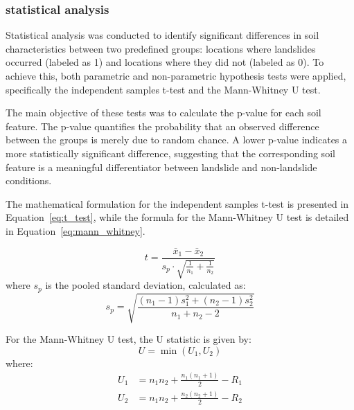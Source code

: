 \subsubsection{statistical analysis}
Statistical analysis was conducted to identify significant differences in soil characteristics between two predefined groups: locations where landslides occurred (labeled as 1) and locations where they did not (labeled as 0). To achieve this, both parametric and non-parametric hypothesis tests were applied, specifically the independent samples t-test and the Mann-Whitney U test.

The main objective of these tests was to calculate the p-value for each soil feature. The p-value quantifies the probability that an observed difference between the groups is merely due to random chance. A lower p-value indicates a more statistically significant difference, suggesting that the corresponding soil feature is a meaningful differentiator between landslide and non-landslide conditions.

The mathematical formulation for the independent samples t-test is presented in Equation~\ref{eq:t_test}, while the formula for the Mann-Whitney U test is detailed in Equation~\ref{eq:mann_whitney}.

\begin{equation} \label{eq:t_test}
t = \frac{\bar{x}_1 - \bar{x}_2}{s_p \cdot \sqrt{\frac{1}{n_1} + \frac{1}{n_2}}}
\end{equation}
where $s_p$ is the pooled standard deviation, calculated as:
\begin{equation} \label{eq:sp_pooled}
s_p = \sqrt{\frac{(n_1 - 1)s_1^2 + (n_2 - 1)s_2^2}{n_1 + n_2 - 2}}
\end{equation}

For the Mann-Whitney U test, the U statistic is given by:
\begin{equation} \label{eq:mann_whitney}
U = \min(U_1, U_2)
\end{equation}
where:
\begin{align}
U_1 &= n_1n_2 + \frac{n_1(n_1 + 1)}{2} - R_1 \label{eq:U1} \\
U_2 &= n_1n_2 + \frac{n_2(n_2 + 1)}{2} - R_2 \label{eq:U2}
\end{align}
